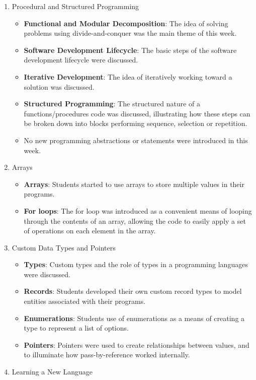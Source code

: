 \begin{enumerate}
\begin{itemize}
  \end{itemize}
  \item Procedural and Structured Programming
  \begin{itemize}[noitemsep,nolistsep]
  	\item \textbf{Functional and Modular Decomposition}: The idea of solving problems using divide-and-conquer was the main theme of this week.
  	\item \textbf{Software Development Lifecycle}: The basic steps of the software development lifecycle were discussed.
  	\item \textbf{Iterative Development}: The idea of iteratively working toward a solution was discussed.
  	\item \textbf{Structured Programming}: The structured nature of a functions/procedures code was discussed, illustrating how these steps can be broken down into blocks performing sequence, selection or repetition.
  	\item No new programming abstractions or statements were introduced in this week.
  \end{itemize}
  \item Arrays
  \begin{itemize}[noitemsep,nolistsep]
  	\item \textbf{Arrays}: Students started to use arrays to store multiple values in their programs.
  	\item \textbf{For loops}: The for loop was introduced as a convenient means of looping through the contents of an array, allowing the code to easily apply a set of operations on each element in the array.
  \end{itemize}
  \item Custom Data Types and Pointers
  \begin{itemize}[noitemsep,nolistsep]
  	\item \textbf{Types}: Custom types and the role of types in a programming languages were discussed.
  	\item \textbf{Records}: Students developed their own custom record types to model entities associated with their programs.
  	\item \textbf{Enumerations}: Students use of enumerations as a means of creating a type to represent a list of options.
  	\item \textbf{Pointers}: Pointers were used to create relationships between values, and to illuminate how pass-by-reference worked internally.
  \end{itemize}
  \item Learning a New Language

\end{enumerate}

